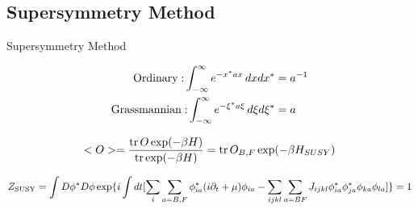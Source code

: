 \subsection{Supersymmetry Method}
\begin{frame}{Supersymmetry Method}

\begin{equation*}
\begin{aligned}
    {\rm Ordinary: }\int _{-\infty }^{\infty }e^{-x^{*}ax}\,dxdx^{*} &= a^{-1} \\
    {\rm Grassmannian: }\int _{-\infty }^{\infty }e^{-\xi^{*}a\xi}\,d\xi d\xi^{*} &= a
\end{aligned}
\end{equation*}

\begin{equation*}
    <O> = \frac{\tr O \exp(-\beta H)}{\tr \exp(-\beta H)} = \tr O_{B,F} \exp(-\beta H_{SUSY})
\end{equation*}

\begin{equation*}
\begin{aligned}
    Z_{\rm SUSY} = \int D\phi^{*} D\phi \exp \{i \int dt [ \sum_{i} \sum_{a=B,F} \phi_{ia}^{*} (i\partial_{t} + \mu) \phi_{ia} - \sum_{ijkl} \sum_{a=BF} J_{ijkl} \phi_{ia}^{*} \phi_{ja}^{*} \phi_{ka} \phi_{la}] \} = 1
\end{aligned}
\end{equation*}


\end{frame}
